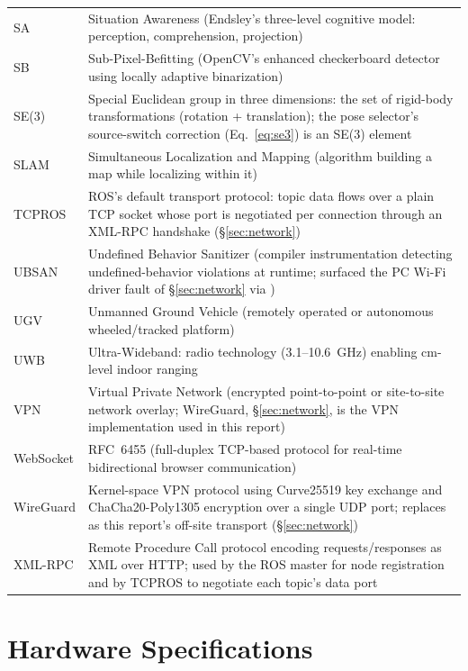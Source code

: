 \begin{longtable}{@{}L{3.6cm}L{10cm}@{}}
SA & Situation Awareness (Endsley's three-level cognitive model: perception, comprehension, projection) \\
SB & Sub-Pixel-Befitting (OpenCV's enhanced checkerboard detector using locally adaptive binarization) \\
SE(3) & Special Euclidean group in three dimensions: the set of rigid-body transformations (rotation + translation); the pose selector's source-switch correction (Eq.~\ref{eq:se3}) is an SE(3) element \\
SLAM & Simultaneous Localization and Mapping (algorithm building a map while localizing within it) \\
TCPROS & ROS's default transport protocol: topic data flows over a plain TCP socket whose port is negotiated per connection through an XML-RPC handshake (\S\ref{sec:network}) \\
UBSAN & Undefined Behavior Sanitizer (compiler instrumentation detecting undefined-behavior violations at runtime; surfaced the PC Wi-Fi driver fault of \S\ref{sec:network} via ) \\
UGV & Unmanned Ground Vehicle (remotely operated or autonomous wheeled/tracked platform) \\
UWB & Ultra-Wideband: radio technology (3.1--10.6~GHz) enabling cm-level indoor ranging \\
VPN & Virtual Private Network (encrypted point-to-point or site-to-site network overlay; WireGuard, \S\ref{sec:network}, is the VPN implementation used in this report) \\
WebSocket & RFC~6455 (full-duplex TCP-based protocol for real-time bidirectional browser communication) \\
WireGuard & Kernel-space VPN protocol using Curve25519 key exchange and ChaCha20-Poly1305 encryption over a single UDP port; replaces  as this report's off-site transport (\S\ref{sec:network}) \\
XML-RPC & Remote Procedure Call protocol encoding requests/responses as XML over HTTP; used by the ROS master for node registration and by TCPROS to negotiate each topic's data port \\
\bottomrule
\end{longtable}
\endgroup

\chapter{Hardware Specifications}
\label{ap:hardware}

